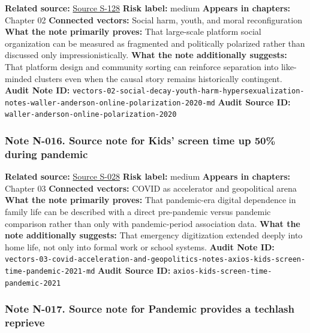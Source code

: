\documentclass[
  american,
  11pt,
  letterpaper,
]{article}
\begin{document}
\textbf{Related source:}
\hyperref[source-s-128-quantifying-social-organization-and-political-polarization-in-online-platforms]{Source
S-128} \textbf{Risk label:} medium \textbf{Appears in chapters:} Chapter
02 \textbf{Connected vectors:} Social harm, youth, and moral
reconfiguration \textbf{What the note primarily proves:} That
large-scale platform social organization can be measured as fragmented
and politically polarized rather than discussed only
impressionistically. \textbf{What the note additionally suggests:} That
platform design and community sorting can reinforce separation into
like-minded clusters even when the causal story remains historically
contingent. \textbf{Audit Note ID:}
\texttt{vectors-02-social-decay-youth-harm-hypersexualization-notes-waller-anderson-online-polarization-2020-md}
\textbf{Audit Source ID:}
\texttt{waller-anderson-online-polarization-2020}

\subsubsection{Note N-016. Source note for Kids' screen time up 50\%
during
pandemic}\label{note-n-016-vectors-03-covid-acceleration-and-geopolitics-notes-axios-kids-screen-time-pandemic-2021-md}

\textbf{Related source:}
\hyperref[source-s-028-kids-screen-time-up-50-during-pandemic]{Source
S-028} \textbf{Risk label:} medium \textbf{Appears in chapters:} Chapter
03 \textbf{Connected vectors:} COVID as accelerator and geopolitical
arena \textbf{What the note primarily proves:} That pandemic-era digital
dependence in family life can be described with a direct pre-pandemic
versus pandemic comparison rather than only with pandemic-period
association data. \textbf{What the note additionally suggests:} That
emergency digitization extended deeply into home life, not only into
formal work or school systems. \textbf{Audit Note ID:}
\texttt{vectors-03-covid-acceleration-and-geopolitics-notes-axios-kids-screen-time-pandemic-2021-md}
\textbf{Audit Source ID:} \texttt{axios-kids-screen-time-pandemic-2021}

\subsubsection{Note N-017. Source note for Pandemic provides a techlash
reprieve}\label{note-n-017-vectors-03-covid-acceleration-and-geopolitics-notes-axios-pandemic-techlash-reprieve-2021-md}
\end{document}
